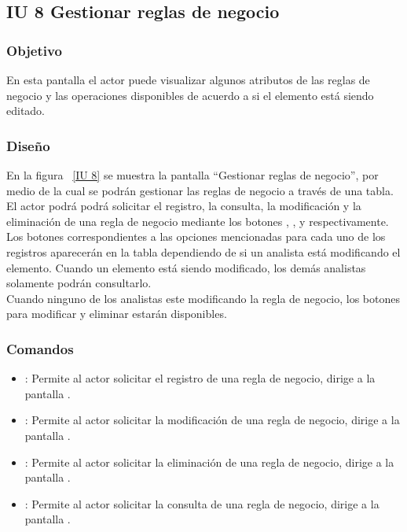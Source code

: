 \newpage 
\subsection{IU 8 Gestionar reglas de negocio}
\subsubsection{Objetivo}
	
	En esta pantalla el actor puede visualizar algunos atributos de las reglas de negocio y las operaciones disponibles de acuerdo a si el elemento está siendo editado.

\subsubsection{Diseño}

    En la figura ~\ref{IU 8} se muestra la pantalla ``Gestionar reglas de negocio'', por medio de la cual 
    se podrán gestionar las reglas de negocio a través de una tabla.
    El actor podrá podrá solicitar el registro, la consulta, la modificación y la eliminación de una regla de negocio mediante los botones
    , \btnConsulta, \btnEditar y \btnEliminar respectivamente. \\
    
    Los botones correspondientes a las opciones mencionadas para cada uno de los registros aparecerán en la tabla dependiendo de si 
    un analista está modificando el elemento. Cuando un elemento está siendo modificado, los demás analistas solamente podrán consultarlo.\\
   
    Cuando ninguno de los analistas este modificando la regla de negocio, los botones para modificar y eliminar estarán disponibles.
    


\subsubsection{Comandos}
\begin{itemize}
	\item {}: Permite al actor solicitar el registro de una regla de negocio, dirige a la pantalla .
	\item \btnEditar[Modificar]: Permite al actor solicitar la modificación de una regla de negocio, dirige a la pantalla .
	\item \btnEliminar[Eliminar]: Permite al actor solicitar la eliminación de una regla de negocio, dirige a la pantalla .
	\item \btnConsulta[Consultar]: Permite al actor solicitar la consulta de una regla de negocio, dirige a la pantalla .
\end{itemize}

